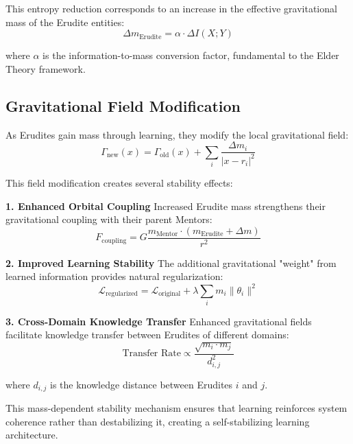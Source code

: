 This entropy reduction corresponds to an increase in the effective gravitational mass of the Erudite entities:
\begin{equation}
\Delta m_{\text{Erudite}} = \alpha \cdot \Delta I(X; Y)
\end{equation}

where $\alpha$ is the information-to-mass conversion factor, fundamental to the Elder Theory framework.

\subsection{Gravitational Field Modification}

As Erudites gain mass through learning, they modify the local gravitational field:
\begin{equation}
\Gamma_{\text{new}}(x) = \Gamma_{\text{old}}(x) + \sum_{i} \frac{\Delta m_i}{|x - r_i|^2}
\end{equation}

This field modification creates several stability effects:

\textbf{1. Enhanced Orbital Coupling}
Increased Erudite mass strengthens their gravitational coupling with their parent Mentors:
\begin{equation}
F_{\text{coupling}} = G \frac{m_{\text{Mentor}} \cdot (m_{\text{Erudite}} + \Delta m)}{r^2}
\end{equation}

\textbf{2. Improved Learning Stability}
The additional gravitational "weight" from learned information provides natural regularization:
\begin{equation}
\mathcal{L}_{\text{regularized}} = \mathcal{L}_{\text{original}} + \lambda \sum_i m_i \|\theta_i\|^2
\end{equation}

\textbf{3. Cross-Domain Knowledge Transfer}
Enhanced gravitational fields facilitate knowledge transfer between Erudites of different domains:
\begin{equation}
\text{Transfer Rate} \propto \frac{\sqrt{m_i \cdot m_j}}{d_{i,j}^2}
\end{equation}

where $d_{i,j}$ is the knowledge distance between Erudites $i$ and $j$.

This mass-dependent stability mechanism ensures that learning reinforces system coherence rather than destabilizing it, creating a self-stabilizing learning architecture.